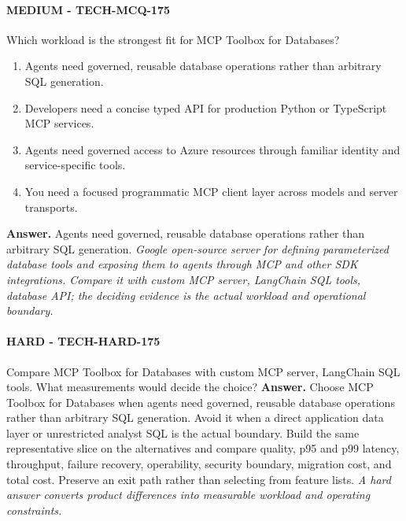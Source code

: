 \paragraph{MEDIUM - TECH-MCQ-175} Which workload is the strongest fit for MCP Toolbox for Databases?
\begin{enumerate}[label=\Alph*.]
\item Agents need governed, reusable database operations rather than arbitrary SQL generation.
\item Developers need a concise typed API for production Python or TypeScript MCP services.
\item Agents need governed access to Azure resources through familiar identity and service-specific tools.
\item You need a focused programmatic MCP client layer across models and server transports.
\end{enumerate}
\textbf{Answer.} Agents need governed, reusable database operations rather than arbitrary SQL generation.
\textit{Google open-source server for defining parameterized database tools and exposing them to agents through MCP and other SDK integrations. Compare it with custom MCP server, LangChain SQL tools, database API; the deciding evidence is the actual workload and operational boundary.}
\paragraph{HARD - TECH-HARD-175} Compare MCP Toolbox for Databases with custom MCP server, LangChain SQL tools. What measurements would decide the choice?
\textbf{Answer.} Choose MCP Toolbox for Databases when agents need governed, reusable database operations rather than arbitrary SQL generation. Avoid it when a direct application data layer or unrestricted analyst SQL is the actual boundary. Build the same representative slice on the alternatives and compare quality, p95 and p99 latency, throughput, failure recovery, operability, security boundary, migration cost, and total cost. Preserve an exit path rather than selecting from feature lists.
\textit{A hard answer converts product differences into measurable workload and operating constraints.}
